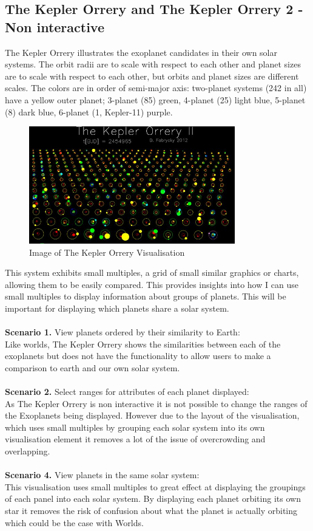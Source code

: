 \subsection{The Kepler Orrery and The Kepler Orrery 2 - Non interactive}
The Kepler Orrery \cite{orrery} illustrates the exoplanet candidates in their
own solar systems. The orbit radii are to scale with respect to each other and
planet sizes are to scale with respect to each other, but orbits and planet
sizes are different scales. The colors are in order of semi-major axis:
two-planet systems (242 in all) have a yellow outer planet; 3-planet (85) green,
4-planet (25) light blue, 5-planet (8) dark blue, 6-planet (1, Kepler-11)
purple. 
\begin{figure}[h!]
  \centering
      \includegraphics[width=0.8\textwidth]{images/orrery.jpg}
  \caption{Image of The Kepler Orrery Visualisation}
\end{figure}
This system exhibits small multiples, a grid of small similar graphics or
charts, allowing them to be easily compared. This provides insights into how I
can use small multiples to display information about groups of planets. This
will be important for displaying which planets share a solar system.
\\\\
{\bf Scenario 1.} View planets ordered by their similarity to Earth:\\
Like worlds, The Kepler Orrery shows the similarities between each of the
exoplanets but does not have the functionality to allow users to make a
comparison to earth and our own solar system.
\\\\
{\bf Scenario 2.} Select ranges for attributes of each planet displayed:\\
As The Kepler Orrery is non interactive it is not possible to change the ranges
of the Exoplanets being displayed. However due to the layout of the
visualisation, which uses small multiples by grouping each solar system into its
own visualisation element it removes a lot of the issue of overcrowding and
overlapping.
\\\\
{\bf Scenario 4.} View planets in the same solar system:\\
This visualisation uses small multiples to great effect at displaying the
groupings of each panel into each solar system. By displaying each planet
orbiting its own star it removes the risk of confusion about what the planet is
actually orbiting which could be the case with Worlds.

